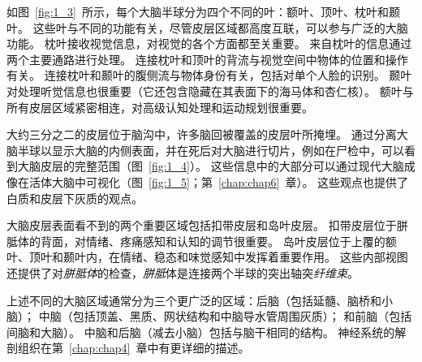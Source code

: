 \begin{proposition}[中枢神经系统的解剖学组织]
	\quad \quad 如图~\ref{fig:1_3}~所示，每个大脑半球分为四个不同的叶：额叶、顶叶、枕叶和颞叶。
	这些叶与不同的功能有关，尽管皮层区域都高度互联，可以参与广泛的大脑功能。
	枕叶接收视觉信息，对视觉的各个方面都至关重要。
	来自枕叶的信息通过两个主要通路进行处理。
	连接枕叶和顶叶的背流与视觉空间中物体的位置和操作有关。
	连接枕叶和颞叶的腹侧流与物体身份有关，包括对单个人脸的识别。
	颞叶对处理听觉信息也很重要（它还包含隐藏在其表面下的海马体和杏仁核）。
	额叶与所有皮层区域紧密相连，对高级认知处理和运动规划很重要。
	
	\quad \quad 大约三分之二的皮层位于脑沟中，许多脑回被覆盖的皮层叶所掩埋。
	通过分离大脑半球以显示大脑的内侧表面，并在死后对大脑进行切片，例如在尸检中，可以看到大脑皮层的完整范围（图~\ref{fig:1_4}）。
	这些信息中的大部分可以通过现代大脑成像在活体大脑中可视化（图~\ref{fig:1_5}；第~\ref{chap:chap6}~章）。
	这些观点也提供了白质和皮层下灰质的观点。
	
	\quad \quad 大脑皮层表面看不到的两个重要区域包括扣带皮层和岛叶皮层。
	扣带皮层位于胼胝体的背面，对情绪、疼痛感知和认知的调节很重要。
	岛叶皮层位于上覆的额叶、顶叶和颞叶内，在情绪、稳态和味觉感知中发挥着重要作用。
	这些内部视图还提供了对\textit{胼胝体}的检查，\textit{胼胝}体是连接两个半球的突出轴突\textit{纤维束}。
	
	上述不同的大脑区域通常分为三个更广泛的区域：后脑（包括延髓、脑桥和小脑）；
	中脑（包括顶盖、黑质、网状结构和中脑导水管周围灰质）；
	和前脑（包括间脑和大脑）。
	中脑和后脑（减去小脑）包括与脑干相同的结构。
	神经系统的解剖组织在第~\ref{chap:chap4}~章中有更详细的描述。
		
\end{proposition}


